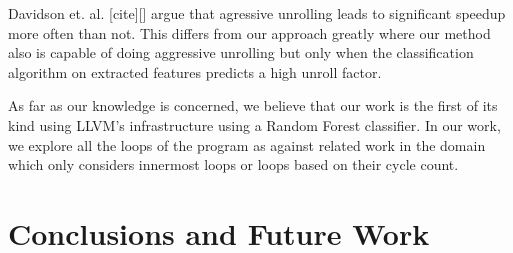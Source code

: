 \documentclass[]{sig-alternate}
\begin{document}
Davidson et. al. [cite][] argue that agressive unrolling leads to significant speedup more often than not. This differs from our approach greatly where our method also is capable of doing aggressive unrolling but only when the classification algorithm on extracted features predicts a high unroll factor.

As far as our knowledge is concerned, we believe that our work is the first of its kind using LLVM's infrastructure using a Random Forest classifier. In our work, we  explore all the loops of the program as against related work in the domain which only considers innermost loops or loops based on their cycle count.

\section{Conclusions and Future Work}
\label{sec:FutureWork}

%

\begin{scriptsize}
  
\end{scriptsize}
\end{document}
